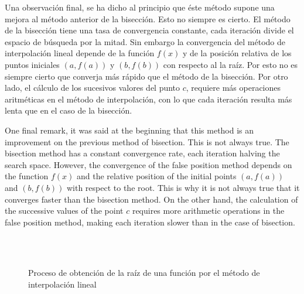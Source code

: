 \begin{paracol}{2}

Una observación final, se ha dicho al principio que éste método supone una mejora al método anterior de la bisección. Esto no siempre es cierto. El método de la bisección tiene una tasa de convergencia constante, cada iteración divide el espacio de búsqueda por la mitad. Sin embargo la convergencia del método de interpolación  lineal depende de la función $f(x)$ y de la posición relativa de los puntos iniciales $(a, f(a))$  y $(b, f(b))$ con respecto al la raíz. Por esto no es siempre cierto que converja más rápido que el método de  la bisección. Por otro lado, el cálculo de los sucesivos valores del punto $c$, requiere más operaciones aritméticas en el método de interpolación, con lo que cada iteración resulta más lenta que en el caso de la bisección.

\switchcolumn

One final remark, it was said at the beginning that this method is an improvement on the previous method of bisection. This is not always true. The bisection method has a constant convergence rate, each iteration halving the search space. However, the convergence of the false position method depends on the function $f(x)$ and the relative position of the initial points $(a, f(a))$ and $(b, f(b))$ with respect to the root. This is why it is not always true that it converges faster than the bisection method. On the other hand, the calculation of the successive values of the point $c$ requires more arithmetic operations in the false position method, making each iteration slower than in the case of bisection.

\end{paracol}

\begin{figure}
\centering
{} \qquad
{}\\
\qquad
{}\\

\caption{Proceso de obtención de la raíz de una función por el método de interpolación lineal}
\label{fig:iterr2}
\end{figure}

